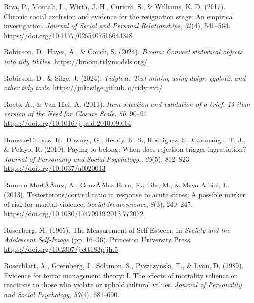 \documentclass[
]{udthesis}
\newlength{\cslhangindent}
\newenvironment{CSLReferences}[2] %
 {\begin{list}{}{%
  \setlength{\itemindent}{0pt}
  \setlength{\leftmargin}{0pt}
  \setlength{\parsep}{0pt}
  \ifodd #1
   \setlength{\leftmargin}{\cslhangindent}
   \setlength{\itemindent}{-1\cslhangindent}
  \fi
  \setlength{\itemsep}{#2\baselineskip}}}
 {\end{list}}
\begin{document}
\begin{CSLReferences}{1}{0}
Riva, P., Montali, L., Wirth, J. H., Curioni, S., \& Williams, K. D. (2017). Chronic social exclusion and evidence for the resignation stage: {An} empirical investigation. \emph{Journal of Social and Personal Relationships}, \emph{34}(4), 541--564. \url{https://doi.org/10.1177/0265407516644348}

Robinson, D., Hayes, A., \& Couch, S. (2024). \emph{Broom: Convert statistical objects into tidy tibbles}. \url{https://broom.tidymodels.org/}

Robinson, D., \& Silge, J. (2024). \emph{Tidytext: Text mining using dplyr, ggplot2, and other tidy tools}. \url{https://juliasilge.github.io/tidytext/}

Roets, A., \& Van Hiel, A. (2011). \emph{Item selection and validation of a brief, 15-item version of the {Need} for {Closure Scale}}. \emph{50}, 90--94. \url{https://doi.org/10.1016/j.paid.2010.09.004}

Romero-Canyas, R., Downey, G., Reddy, K. S., Rodriguez, S., Cavanaugh, T. J., \& Pelayo, R. (2010). Paying to belong: {When} does rejection trigger ingratiation? \emph{Journal of Personality and Social Psychology.}, \emph{99}(5), 802--823. \url{https://doi.org/10.1037/a0020013}

Romero-MartÃÂnez, A., GonzÃÂlez-Bono, E., Lila, M., \& Moya-Albiol, L. (2013). Testosterone/cortisol ratio in response to acute stress: A possible marker of risk for marital violence. \emph{Social Neuroscience}, \emph{8}(3), 240--247. \url{https://doi.org/10.1080/17470919.2013.772072}

Rosenberg, M. (1965). The {Measurement} of {Self}-{Esteem}. In \emph{Society and the {Adolescent Self}-{Image}} (pp. 16--36). {Princeton University Press}. \url{https://doi.org/10.2307/j.ctt183pjjh.5}

Rosenblatt, A., Greenberg, J., Solomon, S., Pyszczynski, T., \& Lyon, D. (1989). Evidence for terror management theory: {I}. {The} effects of mortality salience on reactions to those who violate or uphold cultural values. \emph{Journal of Personality and Social Psychology}, \emph{57}(4), 681--690.


\end{CSLReferences}
\end{document}
